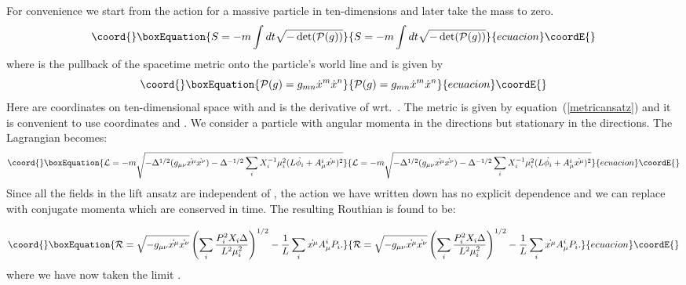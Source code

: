 \documentclass[a4paper,12pt]{article}
\begin{document}
For convenience we start from the action for a massive particle in
ten-dimensions and later take the mass \coordHE{} to zero.
\begin{equation}\coord{}\boxEquation{
  \label{eq:particleprobe}
  S = -m \int dt \sqrt{-\det(\mathcal{P}(g))}  
}{
  S = -m \int dt \sqrt{-\det(\mathcal{P}(g))}  
}{ecuacion}\coordE{}\end{equation}
where \coordHE{} is the pullback of the spacetime metric onto the particle's world line and is given by
\begin{equation}\coord{}\boxEquation{
  \label{eq:pullback}
  \mathcal{P}(g) = g_{m n} \dot{x}^m \dot{x}^n
}{
  \mathcal{P}(g) = g_{m n} \dot{x}^m \dot{x}^n
}{ecuacion}\coordE{}\end{equation}
Here \coordHE{} are coordinates on ten-dimensional space with \coordHE{} and
\coordHE{} is the derivative of \coordHE{} wrt.\ \coordHE{}. The metric \coordHE{} is given by equation~(\ref{metricansatz}) and it is convenient to use coordinates \coordHE{} and \coordHE{}. We consider a particle with angular momenta in the \coordHE{} directions but stationary in the \coordHE{} directions. The Lagrangian becomes:
\begin{equation}\coord{}\boxEquation{
  \label{eq:particleprobe2}
  \mathcal{L} = -m  \sqrt{- \Delta^{1/2}(g_{\mu \nu}\dot{x^{\mu}}\dot{ x^{\nu}}) - \Delta^{-1/2} \sum_i X_i^{-1} \mu_i^2 (L \dot{\phi_i} +  A^i_{\mu} \dot{x^{\mu}})^2}
}{
  \mathcal{L} = -m  \sqrt{- \Delta^{1/2}(g_{\mu \nu}\dot{x^{\mu}}\dot{ x^{\nu}}) - \Delta^{-1/2} \sum_i X_i^{-1} \mu_i^2 (L \dot{\phi_i} +  A^i_{\mu} \dot{x^{\mu}})^2}
}{ecuacion}\coordE{}\end{equation}
Since all the fields in the lift ansatz are independent of \coordHE{}, the action we have written down has no explicit \coordHE{} dependence and we can replace \coordHE{} with conjugate momenta \coordHE{} which are conserved in time. The resulting Routhian is found to be:

\begin{equation}\coord{}\boxEquation{
\mathcal{R} = \sqrt{-g_{\mu \nu}\dot{x^{\mu}}\dot{ x^{\nu}}} \left( \sum_i \frac{P_i^2 X_i \Delta}{L^2\mu_i^2}\right)^{1/2} - \frac{1}{L} \sum_i \dot{x^{\mu}} A^i_{\mu} P_i.
}{
\mathcal{R} = \sqrt{-g_{\mu \nu}\dot{x^{\mu}}\dot{ x^{\nu}}} \left( \sum_i \frac{P_i^2 X_i \Delta}{L^2\mu_i^2}\right)^{1/2} - \frac{1}{L} \sum_i \dot{x^{\mu}} A^i_{\mu} P_i.
}{ecuacion}\coordE{}\end{equation}
where we have now taken the limit \coordHE{}.
\end{document}
